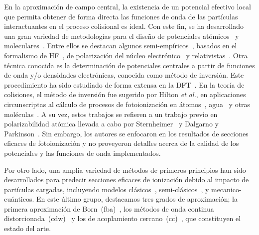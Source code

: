 En la aproximación de campo central, la existencia de un potencial 
efectivo local que permita obtener de forma directa las funciones de 
onda de las partículas interactuantes en el proceso colisional es ideal.
Con este fin, se ha desarrollado una gran variedad de metodologías para 
el diseño de potenciales atómicos~\cite{Hibbert:82} y 
moleculares~\cite{Menchero:10,Granados:16}. Entre ellos se destacan algunos 
semi-empíricos~\cite{falta}, basados en el formalismo de 
HF~\cite{falta}, de polarización del núcleo electrónico~\cite{falta} y 
relativistas~\cite{falta}. Otra técnica conocida es la determinación de 
potenciales centrales a partir de funciones de onda y/o densidades 
electrónicas, conocida como método de inversión. Este procedimiento ha 
sido estudiado de forma extensa en la DFT~\cite{Wu:03,Gaiduk:13,
Ryabinkin:15,Schipper:97,deSilva:12,Kananenka:13,Mura:97,Jacob:11}. 
En la teoría de colisiones, el método de inversión fue sugerido por 
Hilton \textit{et al.}, en aplicaciones circunscriptas al cálculo de 
procesos de fotoionización en átomos~\cite{Hilton:77,Suzer:77}, 
agua~\cite{Hilton:79} y otras moléculas~\cite{Hilton:80,Crljen:87}. A su 
vez, estos trabajos se refieren a un trabajo previo en polarizabilidad 
atómica llevada a cabo por Sternheimer~\cite{Sternheimer:54} y Dalgarno 
y Parkinson~\cite{Dalgarno:59}. Sin embargo, los autores se enfocaron en 
los resultados de secciones eficaces de fotoionización y no proveyeron 
detalles acerca de la calidad de los potenciales y las funciones de 
onda implementados.

Por otro lado, una amplia variedad de métodos de primeros principios han 
sido desarrollados para predecir secciones eficaces de ionización debido 
al impacto de partículas cargadas, incluyendo modelos 
clásicos~\cite{falta}, semi-clásicos~\cite{falta}, y mecanico-cuánticos. 
En este último grupo, destacamos tres grados de aproximación; la primera 
aproximación de Born~(\acs{fba})~\cite{Bates:62,McDowell:61}, los 
métodos de onda continua distorcionada~(\acs{cdw})~\cite{Crothers:10,
Rivarola:87} y los de acoplamiento cercano~(\acs{cc})~\cite{Pindzola:07,
Burke:11,Pindzola:16,Bray:17}, que constituyen el estado del arte.

